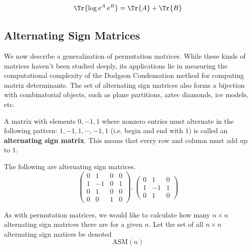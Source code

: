   \begin{corollary}
    \begin{equation}
      \Tr{\log{e^A \, e^B}} = \Tr{A} + \Tr{B}
    \end{equation}
  \end{corollary}

\subsection{Alternating Sign Matrices}

  We now describe a generalization of permutation matrices. While these kinds of matrices haven't been studied deeply, its applications lie in measuring the computational complexity of the Dodgson Condensation method for computing matrix determinants. The set of alternating sign matrices also forms a bijection with combinatorial objects, such as plane partitions, aztec diamonds, ice models, etc. 

  \begin{definition}
    A matrix with elements $0, -1, 1$ where nonzero entries must alternate in the following pattern: $1, -1, 1, \cdots, -1, 1$ (i.e. begin and end with $1$) is called an \textbf{alternating sign matrix}. This means that every row and column must add up to $1$. 
  \end{definition}

  \begin{example}
    The following are alternating sign matrices. 
    \begin{equation}
      \begin{pmatrix}
        0&1&0&0\\1&-1&0&1\\0&1&0&0\\0&0&1&0
        \end{pmatrix}, \begin{pmatrix}
        0&1&0\\1&-1&1\\0&1&0
      \end{pmatrix}
    \end{equation}
  \end{example}

  As with permutation matrices, we would like to calculate how many $n \times n$ alternating sign matrices there are for a given $n$. Let the set of all $n \times n$ alternating sign matices be denoted
  \begin{equation}
    \text{ASM}(n)
  \end{equation}

